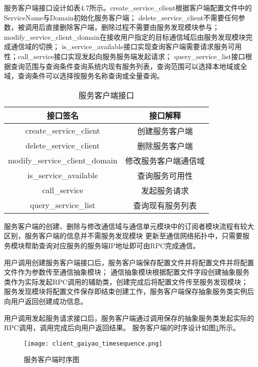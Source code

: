 服务客户端接口设计如表4.7所示。create\_service\_client根据客户端配置文件中的ServiceName与Domain初始化服务客户端；
delete\_service\_client不需要任何参数，被调用后直接删除客户端，删除过程不需要由服务发现模块参与；
modify\_service\_client\_domain在接收用户指定的目标通信域后由服务发现模块完成通信域的切换；
is\_service\_available接口实现查询客户端需要请求服务可用性；call\_service接口实现发起向服务服务端发起请求；
query\_service\_list接口根据查询范围与查询条件查询系统内现有服务列表，查询范围可以选择本地域或全域，查询条件可以选择按服务名称查询或全量查询。
\begin{table}[htb]
  \centering\small
  \caption{服务客户端接口}
  \label{tab:exampletable}
  \begin{tabular}{cc}
    \toprule
    接口签名 & 接口解释 \\
    \midrule
    create\_service\_client & 创建服务客户端\\
    delete\_service\_client & 删除服务客户端\\
    modify\_service\_client\_domain & 修改服务客户端通信域\\
    is\_service\_available & 查询服务可用性 \\
    call\_service & 发起服务请求\\
    query\_service\_list & 查询现有服务列表\\
    \bottomrule
  \end{tabular}
\end{table}

服务客户端的创建、删除与修改通信域与通信单元模块中的订阅者模块流程有较大区别，服务客户端的信息并不需服务发现模块
更新至通信网络拓扑中，只需要服务模块帮助查询对应服务的服务端IP地址即可由RPC完成通信。

用户调用创建服务客户端接口后，服务客户端保存配置文件并将配置文件并将配置文件作为参数传至通信抽象模块；
通信抽象模块根据配置文件字段创建抽象服务类作为实际发起RPC调用的辅助类，创建完成后将配置文件传至服务发现模块；
服务发现模块将配置文件保存即结束创建工作，服务客户端保存抽象服务类实例后向用户返回创建成功信息。

用户调用发起服务请求接口后，服务客户端通过调用保存的抽象服务类发起实际的RPC调用，调用完成后向用户返回结果。
服务客户端的时序设计如图\ref{client_gaiyao_timesequence}所示。

\begin{figure}[H]
  \centering
  \texttt{[image: client\_gaiyao\_timesequence.png]}
  \caption{服务客户端时序图}
  \label{client_gaiyao_timesequence}
\end{figure}

